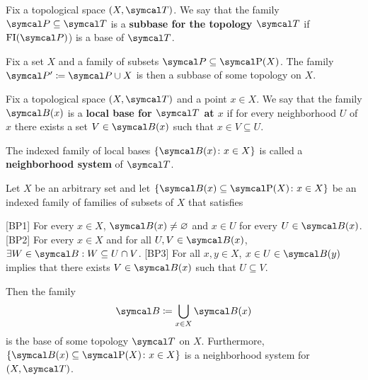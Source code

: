 \begin{definition}\label{def:topological_subbase}\cite[12]{Engelking1989}
  Fix a topological space \( (X, \Cal{T}) \). We say that the family \( \Cal{P} \subseteq \Cal{T} \) is a \textbf{subbase for the topology \( \Cal{T} \)} if \( \FI(\Cal{P}) \)) is a base of \( \Cal{T} \).
\end{definition}

\begin{proposition}
  Fix a set \( X \) and a family of subsets \( \Cal{P} \subseteq \Power(X) \). The family \( \Cal{P}' \coloneqq \Cal{P} \cup X \) is then a subbase of some topology on \( X \).
\end{proposition}

\begin{definition}\label{def:topological_local_base}\cite[12]{Engelking1989}
  Fix a topological space \( (X, \Cal{T}) \) and a point \( x \in X \). We say that the family \( \Cal{B}(x) \) is a \textbf{local base for \( \Cal{T} \) at \( x \)} if for every neighborhood \( U \) of \( x \) there exists a set \( V \in \Cal{B}(x) \) such that \( x \in V \subseteq U \).

  The indexed family of local bases \( \{ \Cal{B}(x) \colon x \in X \} \) is called a \textbf{neighborhood system} of \( \Cal{T} \).
\end{definition}

\begin{proposition}\label{thm:topological_local_base_axioms}\cite[13]{Engelking1989}
  Let \( X \) be an arbitrary set and let \( \{ \Cal{B}(x) \subseteq \Power(X) \colon x \in X \} \) be an indexed family of families of subsets of \( X \) that satisfies
  \begin{description}
    [BP1] For every \( x \in X \), \( \Cal{B}(x) \neq \varnothing \) and \( x \in U \) for every \( U \in \Cal{B}(x) \).
    [BP2] For every \( x \in X \) and for all \( U, V \in \Cal{B}(x) \), \( \exists W \in \Cal{B}: W \subseteq U \cap V \).
    [BP3] For all \( x, y \in X \), \( x \in U \in \Cal{B}(y) \) implies that there exists \( V \in \Cal{B}(x) \) such that \( U \subseteq V \).
  \end{description}

  Then the family
  \begin{equation*}
    \Cal{B} \coloneqq \bigcup_{x \in X} \Cal{B}(x)
  \end{equation*}
  is the base of some topology \( \Cal{T} \) on \( X \). Furthermore, \( \{ \Cal{B}(x) \subseteq \Power(X) \colon x \in X \} \) is a neighborhood system for \( (X, \Cal{T}) \).
\end{proposition}

